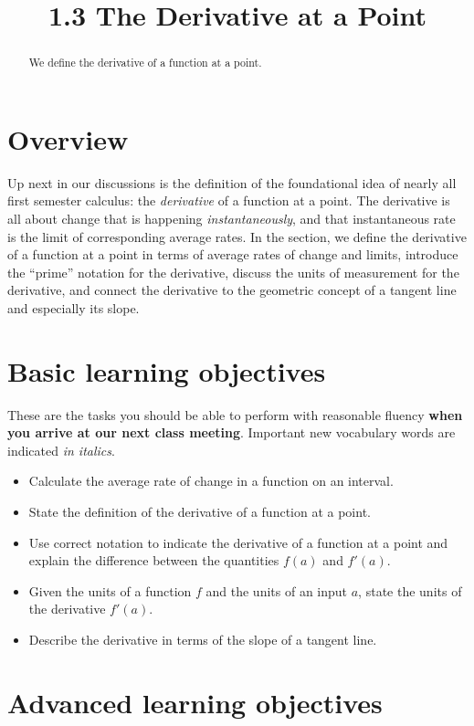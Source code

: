 \documentclass{ximera}
\title{1.3 The Derivative at a Point}
\begin{document}
\begin{abstract}
We define the derivative of a function at a point.
\end{abstract}
\maketitle

\section{Overview}

Up next in our discussions is the definition of the foundational idea of nearly all first semester calculus:  the \emph{derivative} of a function at a point.    The derivative is all about change that is happening \emph{instantaneously}, and that instantaneous rate is the limit of corresponding average rates.  In the section, we define the derivative of a function at a point in terms of average rates of change and limits, introduce the ``prime'' notation for the derivative, discuss the units of measurement for the derivative, and connect the derivative to the geometric concept of a tangent line and especially its slope. 


\section{Basic learning objectives}

These are the tasks you should be able to perform with reasonable fluency \textbf{when you arrive at our next class meeting}. Important new vocabulary words are indicated \emph{in italics}. 

\begin{itemize}
	\item Calculate the average rate of change in a function on an interval. 
	\item State the definition of the derivative of a function at a point. 
	\item Use correct notation to indicate the derivative of a function at a point and explain the difference between the quantities $f(a)$ and $f'(a)$. 
	\item Given the units of a function $f$ and the units of an input $a$, state the units of the derivative $f'(a)$.
	\item Describe the derivative in terms of the slope of a tangent line. 
\end{itemize}

\section{Advanced learning objectives}
\end{document}
